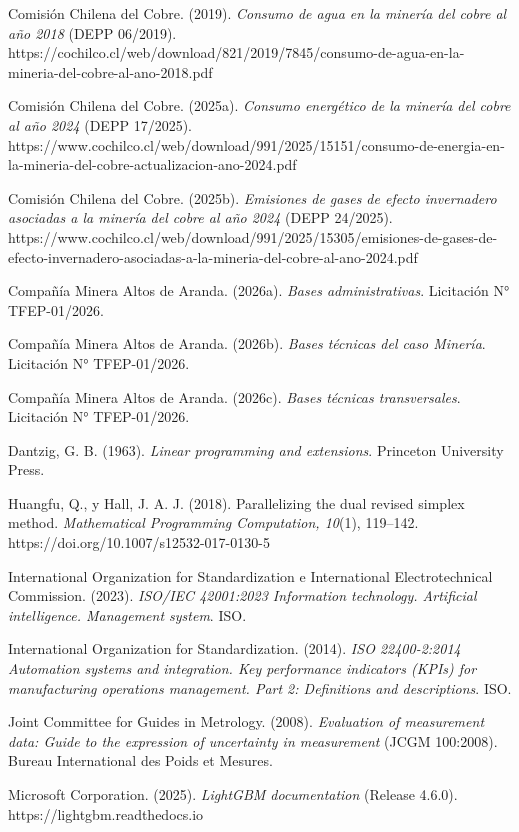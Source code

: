\documentclass[anexo]{../../comun/overfore}
\begin{document}
\begin{referencias}
\item Comisión Chilena del Cobre. (2019). \emph{Consumo de agua en la minería del cobre al año 2018} (DEPP 06/2019). https://cochilco.cl/web/download/821/2019/7845/consumo-de-agua-en-la-mineria-del-cobre-al-ano-2018.pdf
\item Comisión Chilena del Cobre. (2025a). \emph{Consumo energético de la minería del cobre al año 2024} (DEPP 17/2025). https://www.cochilco.cl/web/download/991/2025/15151/consumo-de-energia-en-la-mineria-del-cobre-actualizacion-ano-2024.pdf
\item Comisión Chilena del Cobre. (2025b). \emph{Emisiones de gases de efecto invernadero asociadas a la minería del cobre al año 2024} (DEPP 24/2025). https://www.cochilco.cl/web/download/991/2025/15305/emisiones-de-gases-de-efecto-invernadero-asociadas-a-la-mineria-del-cobre-al-ano-2024.pdf
\item Compañía Minera Altos de Aranda. (2026a). \emph{Bases administrativas}. Licitación N° TFEP-01/2026.
\item Compañía Minera Altos de Aranda. (2026b). \emph{Bases técnicas del caso Minería}. Licitación N° TFEP-01/2026.
\item Compañía Minera Altos de Aranda. (2026c). \emph{Bases técnicas transversales}. Licitación N° TFEP-01/2026.
\item Dantzig, G. B. (1963). \emph{Linear programming and extensions}. Princeton University Press.
\item Huangfu, Q., y Hall, J. A. J. (2018). Parallelizing the dual revised simplex method. \emph{Mathematical Programming Computation, 10}(1), 119–142. https://doi.org/10.1007/s12532-017-0130-5
\item International Organization for Standardization e International Electrotechnical Commission. (2023). \emph{ISO/IEC 42001:2023 Information technology. Artificial intelligence. Management system}. ISO.
\item International Organization for Standardization. (2014). \emph{ISO 22400-2:2014 Automation systems and integration. Key performance indicators (KPIs) for manufacturing operations management. Part 2: Definitions and descriptions}. ISO.
\item Joint Committee for Guides in Metrology. (2008). \emph{Evaluation of measurement data: Guide to the expression of uncertainty in measurement} (JCGM 100:2008). Bureau International des Poids et Mesures.
\item Microsoft Corporation. (2025). \emph{LightGBM documentation} (Release 4.6.0). https://lightgbm.readthedocs.io

\end{referencias}
\end{document}
